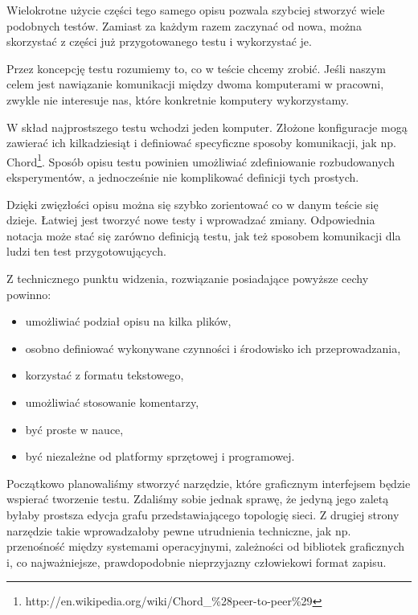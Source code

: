 \documentclass[00-praca-magisterska.tex]{subfiles}
\begin{document}
Wielokrotne użycie części tego samego opisu pozwala szybciej stworzyć wiele
podobnych testów. Zamiast za każdym razem zaczynać od nowa, można skorzystać z
części już przygotowanego testu i wykorzystać je.

Przez koncepcję testu rozumiemy to, co w teście chcemy zrobić. Jeśli naszym
celem jest nawiązanie komunikacji między dwoma komputerami w pracowni, zwykle
nie interesuje nas, które konkretnie komputery wykorzystamy.

W skład najprostszego testu wchodzi jeden komputer. Złożone konfiguracje mogą
zawierać ich kilkadziesiąt i definiować specyficzne sposoby komunikacji, jak
np. Chord\footnote{http://en.wikipedia.org/wiki/Chord\_\%28peer-to-peer\%29}.
Sposób opisu testu powinien umożliwiać zdefiniowanie rozbudowanych
eksperymentów, a jednocześnie nie komplikować definicji tych prostych.

Dzięki zwięzłości opisu można się szybko zorientować co w danym teście się
dzieje. Łatwiej jest tworzyć nowe testy i wprowadzać zmiany. Odpowiednia
notacja może stać się zarówno definicją testu, jak też sposobem komunikacji
dla ludzi ten test przygotowujących.

Z technicznego punktu widzenia, rozwiązanie posiadające powyższe cechy
powinno:
\begin{itemize}
\item umożliwiać podział opisu na kilka plików,
\item osobno definiować wykonywane czynności i środowisko ich przeprowadzania,
\item korzystać z formatu tekstowego,
\item umożliwiać stosowanie komentarzy,
\item być proste w nauce,
\item być niezależne od platformy sprzętowej i programowej.
\end{itemize}

Początkowo planowaliśmy stworzyć narzędzie, które graficznym interfejsem
będzie wspierać tworzenie testu. Zdaliśmy sobie jednak sprawę, że jedyną jego
zaletą byłaby prostsza edycja grafu przedstawiającego topologię sieci. Z
drugiej strony narzędzie takie wprowadzałoby pewne utrudnienia techniczne, jak
np. przenośność między systemami operacyjnymi, zależności od bibliotek
graficznych i, co najważniejsze, prawdopodobnie nieprzyjazny człowiekowi
format zapisu.
\end{document}
